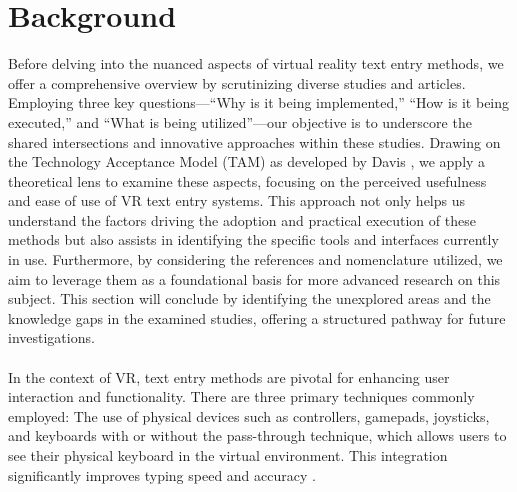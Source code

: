 \chapter{Background}
\label{sec:background}

Before delving into the nuanced aspects of virtual reality text entry methods, we offer a comprehensive overview by scrutinizing diverse studies and articles. Employing three key questions—``Why is it being implemented,'' ``How is it being executed,'' and ``What is being utilized''—our objective is to underscore the shared intersections and innovative approaches within these studies. Drawing on the Technology Acceptance Model (TAM) as developed by Davis \cite{davis1989}, we apply a theoretical lens to examine these aspects, focusing on the perceived usefulness and ease of use of VR text entry systems. This approach not only helps us understand the factors driving the adoption and practical execution of these methods but also assists in identifying the specific tools and interfaces currently in use. Furthermore, by considering the references and nomenclature utilized, we aim to leverage them as a foundational basis for more advanced research on this subject. This section will conclude by identifying the unexplored areas and the knowledge gaps in the examined studies, offering a structured pathway for future investigations.\\ \\
In the context of \ac{VR}, text entry methods are pivotal for enhancing user interaction and functionality. There are three primary techniques commonly employed: The use of physical devices such as controllers, gamepads, joysticks, and keyboards \cite{dube2019textentry} with or without the pass-through technique, which allows users to see their physical keyboard in the virtual environment. This integration significantly improves typing speed and accuracy \cite{giovannelli2022visual}. 
